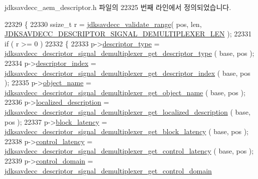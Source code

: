 jdksavdecc\+\_\+aem\+\_\+descriptor.\+h 파일의 22325 번째 라인에서 정의되었습니다.


\begin{DoxyCode}
22329 \{
22330     ssize\_t r = \hyperlink{group__util_ga9c02bdfe76c69163647c3196db7a73a1}{jdksavdecc\_validate\_range}( pos, len, 
      \hyperlink{group__descriptor__signal__demultiplexer_ga359e8ecd2c1c5ab25eb590c5dc3998ad}{JDKSAVDECC\_DESCRIPTOR\_SIGNAL\_DEMULTIPLEXER\_LEN} );
22331     \textcolor{keywordflow}{if} ( r >= 0 )
22332     \{
22333         p->\hyperlink{structjdksavdecc__descriptor__signal__demultiplexer_ab7c32b6c7131c13d4ea3b7ee2f09b78d}{descriptor\_type} = 
      \hyperlink{group__descriptor__signal__demultiplexer_ga3533becd15730cfd744d851c05dcdd3b}{jdksavdecc\_descriptor\_signal\_demultiplexer\_get\_descriptor\_type}
      ( base, pos );
22334         p->\hyperlink{structjdksavdecc__descriptor__signal__demultiplexer_a042bbc76d835b82d27c1932431ee38d4}{descriptor\_index} = 
      \hyperlink{group__descriptor__signal__demultiplexer_ga9cc7ad93d9b5c4a6938e3de30dd3af68}{jdksavdecc\_descriptor\_signal\_demultiplexer\_get\_descriptor\_index}
      ( base, pos );
22335         p->\hyperlink{structjdksavdecc__descriptor__signal__demultiplexer_a7d1f5945a13863b1762fc6db74fa8f80}{object\_name} = 
      \hyperlink{group__descriptor__signal__demultiplexer_ga3a72d4ee560220aec7e7eae679f9c01a}{jdksavdecc\_descriptor\_signal\_demultiplexer\_get\_object\_name}
      ( base, pos );
22336         p->\hyperlink{structjdksavdecc__descriptor__signal__demultiplexer_a0926f846ca65a83ad5bb06b4aff8f408}{localized\_description} = 
      \hyperlink{group__descriptor__signal__demultiplexer_ga235e35f6c688e3ad90a7504d4eca509c}{jdksavdecc\_descriptor\_signal\_demultiplexer\_get\_localized\_description}
      ( base, pos );
22337         p->\hyperlink{structjdksavdecc__descriptor__signal__demultiplexer_ae2e9f0088d5e900b610d1b2818dfc559}{block\_latency} = 
      \hyperlink{group__descriptor__signal__demultiplexer_gab898ca71605465944a08b3154adb9895}{jdksavdecc\_descriptor\_signal\_demultiplexer\_get\_block\_latency}
      ( base, pos );
22338         p->\hyperlink{structjdksavdecc__descriptor__signal__demultiplexer_ab2bd4639caaf9a8078b68368afbd63b6}{control\_latency} = 
      \hyperlink{group__descriptor__signal__demultiplexer_gaf872311671b5eb131352eda97c644d97}{jdksavdecc\_descriptor\_signal\_demultiplexer\_get\_control\_latency}
      ( base, pos );
22339         p->\hyperlink{structjdksavdecc__descriptor__signal__demultiplexer_a8937b22996b7c28ae209f29fe777f03a}{control\_domain} = 
      \hyperlink{group__descriptor__signal__demultiplexer_gaba227a20ae1cf99c4a6065852922698f}{jdksavdecc\_descriptor\_signal\_demultiplexer\_get\_control\_domain}

\end{DoxyCode}
